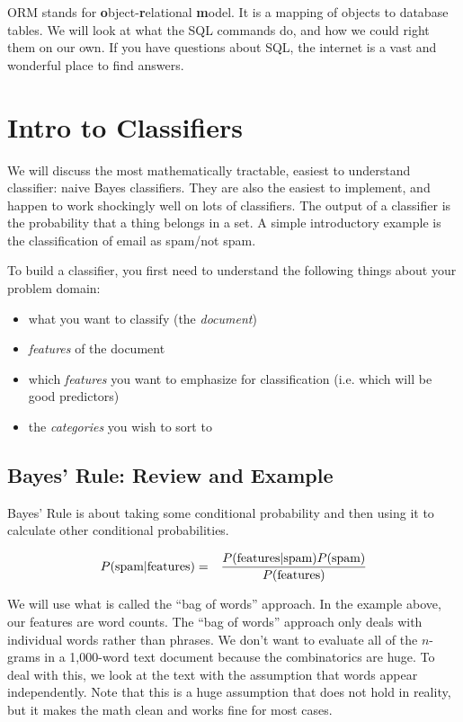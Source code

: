 \documentclass[12pt,letter]{article}
\begin{document}
ORM stands for \textbf{o}bject-\textbf{r}elational \textbf{m}odel. It is a mapping of objects to
database tables. We will look at what the SQL commands do, and how we could right them
on our own. If you have questions about SQL, the internet is a vast
and wonderful place to find answers. 


\section{Intro to Classifiers}

We will discuss the most mathematically tractable, easiest to
understand classifier: naive Bayes classifiers. They are also the
easiest to implement, and happen to work shockingly well on lots of
classifiers. The output of a classifier is the probability that a
thing belongs in a set. A simple introductory example is the
classification of email as spam/not spam. 

To build a classifier, you first need to understand the following
things about your problem domain: 
\begin{itemize}
\item what you want to classify (the \emph{document})
\item \emph{features} of the document
\item which \emph{features} you want to emphasize for classification
  (i.e. which will be good predictors)
\item the \emph{categories} you wish to sort to
\end{itemize}

\subsection{Bayes' Rule: Review and Example}
Bayes' Rule is about taking some conditional probability and then
using it to calculate other conditional probabilities.

\begin{eqnarray*}
P(\text{spam}|\text{features}) &=&
{{P(\text{features}|\text{spam})P(\text{spam})} \over P(\text{features})}
\end{eqnarray*}

We will use what is called the ``bag of words'' approach. In the
example above, our features are word counts. The ``bag of words''
approach only deals with individual words rather than phrases. We
don't want to evaluate all of the $n$-grams in a 1,000-word text
document because the combinatorics are huge. To deal with this, we
look at the text with the assumption that words appear
independently. Note that this is a huge assumption that does not hold
in reality, but it makes the math clean and works fine for most
cases.\footnotemark {} 
\end{document}
